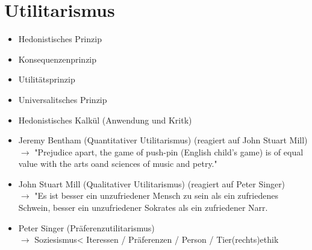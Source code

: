 
\section{Utilitarismus}

\begin{itemize}
    \item Hedonistisches Prinzip
    \item Konsequenzenprinzip
    \item Utilitätsprinzip
    \item Universalitsches Prinzip
    \item Hedonistisches Kalkül (Anwendung und Kritk)
\end{itemize}

\begin{itemize}
    \item Jeremy Bentham (Quantitativer Utilitarismus) (reagiert auf John Stuart Mill) \\
        $\rightarrow$ "Prejudice apart, the game of push-pin (English child's game) is of equal value with the arts oand sciences of music and petry."
    \item John Stuart Mill (Qualitativer Utilitarismus) (reagiert auf Peter Singer) \\
        $\rightarrow$ "Es ist besser ein unzufriedener Mensch zu sein als ein zufriedenes Schwein, besser ein unzufriedener Sokrates als ein zufriedener Narr.
    \item Peter Singer (Präferenzutilitarismus) \\
        $\rightarrow$ Soziesismus< Iteressen / Präferenzen / Person / Tier(rechts)ethik
\end{itemize}

